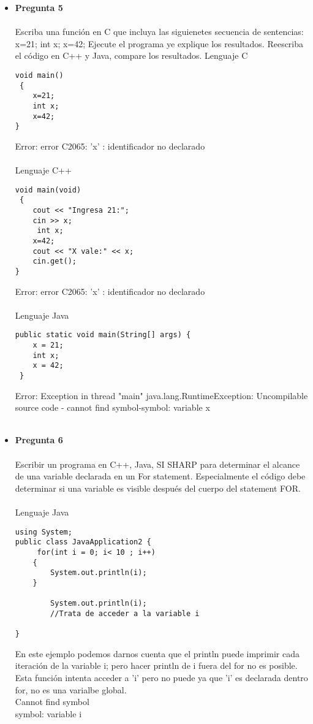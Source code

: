 \documentclass[12pt,oneside]{article}
\begin{document}
\begin{itemize}
\item {\bf Pregunta 5} \\\\
Escriba una función en C que incluya las siguienetes secuencia de sentencias:
x=21;
int x;
x=42;
Ejecute el programa ye explique los resultados. Reescriba el código en C++ y Java, compare los resultados.
Lenguaje C
\begin{lstlisting}[frame=single]
void main()
 {
 	x=21;
	int x;
	x=42;
}
\end{lstlisting}
Error:  error C2065: 'x' : identificador no declarado\\\\
Lenguaje C++
\begin{lstlisting}[frame=single]
void main(void)
 {
 	cout << "Ingresa 21:";
 	cin >> x;
 	 int x;
 	x=42;
 	cout << "X vale:" << x;
 	cin.get();
}
\end{lstlisting}
Error: error C2065: 'x' : identificador no declarado \\\\
Lenguaje Java
\begin{lstlisting}[frame=single]
 public static void main(String[] args) {         
    x = 21;
    int x;
    x = 42;        
 }
\end{lstlisting}
Error: Exception in thread "main" java.lang.RuntimeException: Uncompilable source code - cannot find symbol-symbol: variable x\\\\ 

\item {\bf Pregunta 6} \\\\
Escribir un programa en C++, Java, SI SHARP para determinar el alcance de una variable declarada en un For statement. Especialmente el código debe determinar si una variable es visible después del cuerpo del statement FOR.\\\\

Lenguaje Java\\
\begin{lstlisting}[frame=single]  % Start your code-block
using System;
public class JavaApplication2 {
	 for(int i = 0; i< 10 ; i++)
	{
 		System.out.println(i);
	}
 	
 		System.out.println(i);  
		//Trata de acceder a la variable i
	
}
\end{lstlisting}
En este ejemplo podemos darnos cuenta que el println puede imprimir cada iteración de la variable i; pero hacer println de i fuera del for no es posible. Esta función intenta acceder a 'i' pero no puede ya que 'i' es declarada dentro for, no es una varialbe global.\\
Cannot find symbol\\
symbol: variable i\\\\



\end{itemize}
\end{document}
